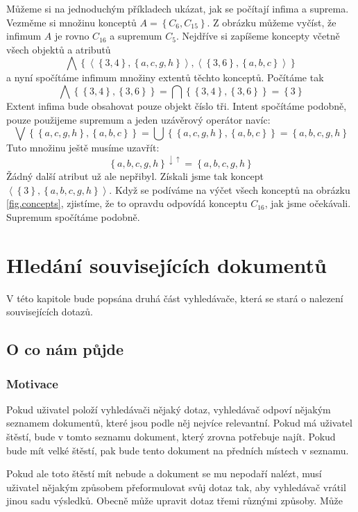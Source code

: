 \documentclass[12pt]{article}
\newcommand{\ssection}[1]{\subsection{#1}}
\newcommand{\sssection}[1]{\subsubsection{#1}}
\newcommand{\adds}[1]{\left\{#1\right\}}
\newcommand{\addsp}[1]{\left<#1\right>}
\newcommand{\downup}{^{\downarrow\uparrow}}
\newcommand{\biginf}{\bigwedge}
\newcommand{\bigsup}{\bigvee}
\begin{document}
Můžeme si na jednoduchým příkladech ukázat, jak se počítají infima a suprema. Vezměme si množinu konceptů $A=\adds{C_6, C_{15}}$. Z obrázku můžeme vyčíst, že infimum $A$ je rovno $C_{16}$ a supremum $C_5$. Nejdříve si zapíšeme koncepty včetně všech objektů a atributů
$$\biginf \adds{\addsp{\adds{3, 4}, \adds{a, c, g, h}}, \addsp{\adds{3, 6}, \adds{a, b, c}}}$$
a nyní spočítáme infimum množiny extentů těchto konceptů. Počítáme tak
$$
\biginf\adds{\adds{3, 4}, \adds{3, 6}} = \bigcap\adds{\adds{3, 4}, \adds{3, 6}} =\adds{3}
$$
Extent infima bude obsahovat pouze objekt číslo tři. Intent spočítáme podobně, pouze použijeme supremum a jeden uzávěrový operátor navíc: 
$$
\bigsup\adds{\adds{a,c,g,h}, \adds{a,b,c}}=\bigcup\adds{\adds{a,c,g,h}, \adds{a,b,c}}=\adds{a,b,c,g,h}
$$
Tuto množinu ještě musíme uzavřít:
$$
\adds{a,b,c,g,h}\downup=\adds{a,b,c,g,h}
$$
Žádný další atribut už ale nepřibyl. Získali jsme tak koncept $\addsp{\adds{3}, \adds{a,b,c,g,h}}$. Když se podíváme na výčet všech konceptů na obrázku \ref{fig.concepts}, zjistíme, že to opravdu odpovídá konceptu $C_{16}$, jak jsme očekávali. Supremum spočítáme podobně. 

















\newpage
\section{Hledání souvisejících dokumentů}
V této kapitole bude popsána druhá část vyhledávače, která se stará o nalezení souvisejících dotazů. 

\ssection{O co nám půjde}

\sssection{Motivace}

Pokud uživatel položí vyhledávači nějaký dotaz, vyhledávač odpoví nějakým seznamem dokumentů, které jsou podle něj nejvíce relevantní. Pokud má uživatel štěstí, bude v tomto seznamu dokument, který zrovna potřebuje najít. Pokud bude mít velké štěstí, pak bude tento dokument na předních místech v seznamu. 

Pokud ale toto štěstí mít nebude a dokument se mu nepodaří nalézt, musí uživatel nějakým způsobem přeformulovat svůj dotaz tak, aby vyhledávač vrátil jinou sadu výsledků. Obecně může upravit dotaz třemi různými způsoby. Může
\end{document}
